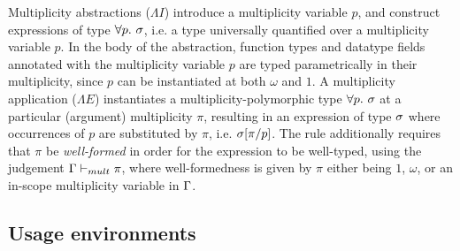 \documentclass[acmsmall,review,screen]{acmart}
\newcommand{\ROUNDTWO}[1]{{\color{red}#1}}
\begin{document}
Multiplicity abstractions ($\Lambda I$) introduce a multiplicity variable $p$,
and construct expressions of type $\forall p.~\sigma$, i.e. a type universally
quantified over a multiplicity variable $p$. \ROUNDTWO{In the body
of the abstraction, function types and datatype fields annotated with the multiplicity
variable $p$ are typed parametrically in their multiplicity, since} $p$ can be instantiated at both $\omega$ and $1$.
A multiplicity application ($\Lambda E$) instantiates a multiplicity-polymorphic type
$\forall p.~\sigma$ at a particular (argument) multiplicity $\pi$, resulting in an
expression of type $\sigma$ where occurrences of $p$ are substituted by $\pi$, i.e.
$\sigma[\pi/p]$.
The rule additionally requires that $\pi$ be \emph{well-formed} in order
for the expression to be well-typed, using the judgement $\Gamma \vdash_{mult}
\pi$, where well-formedness is given by $\pi$ either being $1$, $\omega$, or an
in-scope  multiplicity variable in $\Gamma$.



\subsection{Usage environments\label{sec:usage-environments}}
\end{document}
